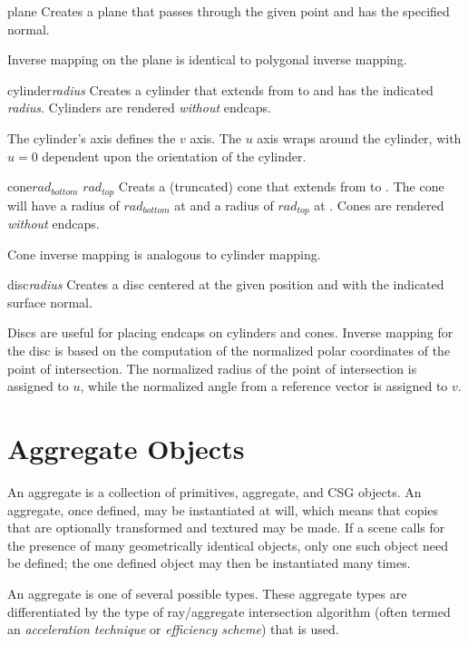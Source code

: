 \begin{defprim}{plane}{ }
	Creates a plane that passes through the given point and
	has the specified normal.
\end{defprim}
Inverse mapping on the plane is identical to polygonal inverse mapping.

\begin{defprim}{cylinder}{{\em radius}  }
	Creates a cylinder that extends from  to 
	and has the indicated {\em radius}.  Cylinders are rendered
	{\em without} endcaps.
\end{defprim}
The cylinder's axis defines the $v$ axis.  The $u$ axis wraps around the
cylinder, with $u=0$ dependent upon the orientation of the cylinder.


\begin{defprim}{cone}{$rad_{bottom}$  $rad_{top}$ }
	Creats a (truncated) cone that extends from  to
	.  The cone will have a radius of $rad_{bottom}$ at
	 and a radius of $rad_{top}$ at .
	Cones are rendered {\em without} endcaps.
\end{defprim}
Cone inverse mapping is analogous to cylinder mapping.

\begin{defprim}{disc}{{\em radius}  }
	Creates a disc centered at the given position and with the
	indicated surface normal.
\end{defprim}
Discs are useful for placing
endcaps on cylinders and cones.
Inverse mapping for the disc is based on the computation of the
normalized polar coordinates of the point of intersection.  The
normalized radius
of the point of intersection is assigned to $u$, while the normalized angle
from a reference vector is assigned to $v$.

\section{Aggregate Objects}

An aggregate is a collection of primitives, aggregate, and CSG
objects.  An aggregate, once defined, may be instantiated at will,
which means that
copies that are optionally transformed and textured may be made.
If a scene calls for the presence of many geometrically identical
objects, only one such object need be defined; the one defined object
may then be instantiated many times.

An aggregate is one of several possible types.  These aggregate types
are differentiated by the type of ray/aggregate intersection algorithm
(often termed an {\em acceleration technique} or {\em efficiency scheme})
that is used.

